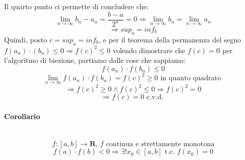 \documentclass{report}
\newcommand{\subsubsubsection}[1]{\paragraph{#1}\mbox{}\\}
\begin{document}
                Il quarto punto ci permette di concludere che:
                $$\lim_{n \to \infty} b_n - a_n = \frac{b - a}{2^n} = 0 \Longrightarrow \lim_{n \to \infty} b_n = \lim_{n \to \infty} a_n$$
                $$\Longrightarrow sup_a = inf_b$$
                Quindi, posto $c = sup_a = inf_b$, e per il teorema della permanenza del segno 
                $f\left(a_n\right) \cdot \left(b_n\right) \leq 0 \Longrightarrow f\left(c\right)^2 \leq 0 $
                volendo dimostrare che $f\left(c\right) = 0$ per l'algoritmo di biezione, 
                partiamo dalle cose che sappiamo:
                $$f\left(a_n\right) \cdot f\left(b_n\right) \leq 0$$
                $$\lim_{n \to \infty} f\left(a_n\right) \cdot f\left(b_n\right) = f\left(c\right)^2 \geq 0 \textrm { in quanto quadrato }$$
                $$\Longrightarrow f\left(c\right)^2 \geq 0 \wedge f\left(c\right)^2 \leq 0 \Longrightarrow f\left(c\right)^2 = 0$$
                $$\Longrightarrow f\left(c\right) = 0 \textrm{ c.v.d. }$$
            \subsubsubsection{Corollario}
                $$f: \left[a, b\right] \longrightarrow \mathbf{R}, \, f \textrm{ continua e strettamente monotona}$$
                $$f\left(a\right) \cdot f\left(b\right) < 0 \Longrightarrow 
                    \exists! x_0 \in \left[a, b\right] \textrm{ t.c. } f\left(x_0\right) = 0$$
\end{document}
